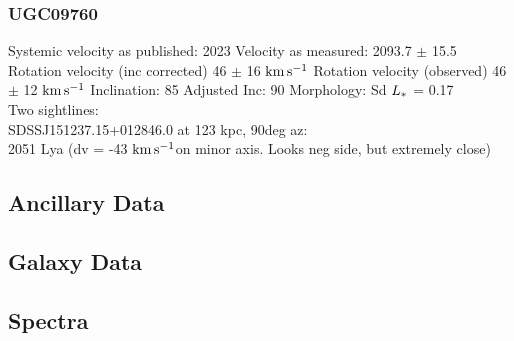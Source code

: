 \documentclass[iop]{emulateapj-rtx4}
\newcommand{\kms}{$\rm km\, s^{-1}$}
\begin{document}
\subsubsection{UGC09760}
Systemic velocity as published: 2023
Velocity as measured: 2093.7 $\pm$ 15.5
Rotation velocity (inc corrected) 46 $\pm$ 16 \kms
Rotation velocity (observed) 46 $\pm$ 12 \kms
Inclination: 85
Adjusted Inc: 90
Morphology: Sd
$L_{\**}$ = 0.17 \\

Two sightlines: \\
SDSSJ151237.15+012846.0 at 123 kpc, 90deg az: \\
2051 Lya (dv = -43 \kms on minor axis. Looks neg side, but extremely close)



\subsection{Ancillary Data}


\subsection{Galaxy Data}







\subsection{Spectra}
\end{document}
